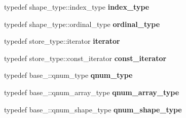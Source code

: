 \begin{DoxyCompactItemize}
\item 
\hypertarget{classbtas_1_1_sp_tensor_a62cdc03d7b661491acf4264ec98e63ae}{
typedef shape\_\-type::index\_\-type {\bfseries index\_\-type}}
\label{classbtas_1_1_sp_tensor_a62cdc03d7b661491acf4264ec98e63ae}

\item 
\hypertarget{classbtas_1_1_sp_tensor_a727533d069f9c280910b65684cfdb639}{
typedef shape\_\-type::ordinal\_\-type {\bfseries ordinal\_\-type}}
\label{classbtas_1_1_sp_tensor_a727533d069f9c280910b65684cfdb639}

\item 
\hypertarget{classbtas_1_1_sp_tensor_adb373c48e37b614ac0639bc0c0b191de}{
typedef store\_\-type::iterator {\bfseries iterator}}
\label{classbtas_1_1_sp_tensor_adb373c48e37b614ac0639bc0c0b191de}

\item 
\hypertarget{classbtas_1_1_sp_tensor_aa40db2872dd6c8073d5972ec8949b8f6}{
typedef store\_\-type::const\_\-iterator {\bfseries const\_\-iterator}}
\label{classbtas_1_1_sp_tensor_aa40db2872dd6c8073d5972ec8949b8f6}

\item 
\hypertarget{classbtas_1_1_sp_tensor_a6a784ffff40562c1a15b806348900dca}{
typedef base\_\-::qnum\_\-type {\bfseries qnum\_\-type}}
\label{classbtas_1_1_sp_tensor_a6a784ffff40562c1a15b806348900dca}

\item 
\hypertarget{classbtas_1_1_sp_tensor_a7960cb62a2c431ece39ea4fc1088e59d}{
typedef base\_\-::qnum\_\-array\_\-type {\bfseries qnum\_\-array\_\-type}}
\label{classbtas_1_1_sp_tensor_a7960cb62a2c431ece39ea4fc1088e59d}

\item 
\hypertarget{classbtas_1_1_sp_tensor_a3eb02a4012f5e94a82908dc44b473f3d}{
typedef base\_\-::qnum\_\-shape\_\-type {\bfseries qnum\_\-shape\_\-type}}
\label{classbtas_1_1_sp_tensor_a3eb02a4012f5e94a82908dc44b473f3d}

\end{DoxyCompactItemize}

